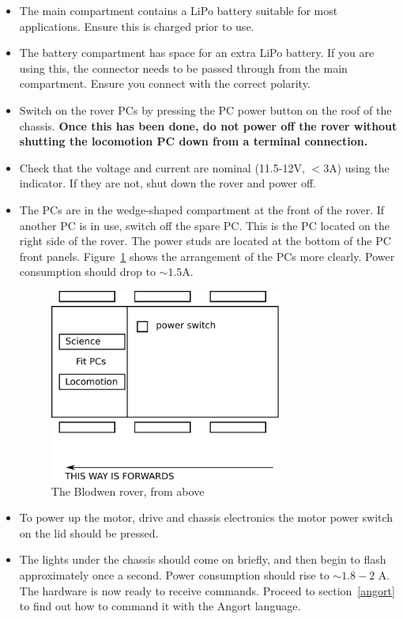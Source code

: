 \begin{itemize}
\item The main compartment contains a LiPo battery suitable for most applications. Ensure this is charged
prior to use.
\item The battery compartment has space for an extra LiPo battery. If you are using this, the connector
needs to be passed through from the main compartment. Ensure you connect with the correct polarity.
\item Switch on the rover PCs by pressing the PC power button on the roof of the chassis.
\textbf{Once this has been done, do not power off the rover without shutting the locomotion PC down from
a terminal connection.}
\item Check that the voltage and current are nominal (11.5-12V, $<3$A) using the indicator. If they are
not, shut down the rover and power off.
\item The PCs are in the wedge-shaped compartment at the front of the rover.
If another PC is in use, switch off the spare PC. This is the PC located on the right side of the rover.
The power studs are located at the bottom of the PC
front panels. Figure~\ref{fig:blod2} shows the arrangement of the PCs more clearly. Power consumption should drop
to $\sim 1.5$A.
\begin{figure}[ht]
\center
\includegraphics[width=3in]{blod2.pdf}
\caption{The Blodwen rover, from above}
\label{fig:blod2}
\end{figure}
\item To power up the motor, drive and chassis electronics the motor power switch on the lid should be pressed.
\item The lights under the chassis should come on briefly, and then begin to flash approximately
once a second. Power consumption should rise to $\sim 1.8-2$ A. The hardware is now ready to receive commands. Proceed to
section~\ref{angort} to find out how to command it with the Angort language.
\end{itemize}

